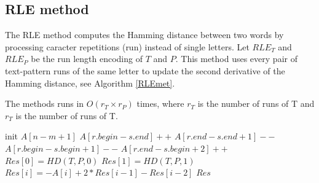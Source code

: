 \documentclass[preprint,12pt]{elsarticle}
\begin{document}










\subsection{RLE method}

The RLE method computes the Hamming distance between two words
by processing caracter repetitions (run) instead of single letters.  
Let $RLE_T$ and $RLE_P$ be the run length encoding of $T$ and $P$.
This method uses every pair of text-pattern runs of the same letter
to update the second derivative of the Hamming distance,
see Algorithm \ref{RLEmet}.

The methods runs in $O(r_T \times r_P)$ times,
where $r_T$ is the number of runs of T and $r_T$ is the number of runs of T.


\begin{algorithm}
\label{RLEmet}
\caption{$RLE(RLE_T, RLE_P)$}
\begin{algorithmic}

\STATE init $A[n-m+1]$
			\STATE $A[r.begin - s.end] ++$
			\STATE $A[r.end-s.end+1] --$
			\STATE $A[r.begin - s.begin+1]--$
			\STATE $A[r.end - s.begin +2] ++$
		\ENDIF
	\ENDFOR
\ENDFOR
\STATE $Res[0] = HD(T, P, 0)$
\STATE $Res[1] = HD(T, P, 1)$
	\STATE $Res[i] = -A[i] + 2 * Res[i-1] - Res[i-2]$
\ENDFOR
\RETURN $Res$

\end{algorithmic}
\end{algorithm}
\end{document}

